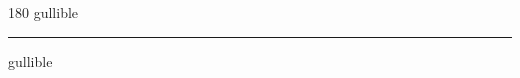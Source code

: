 
\begin{frame}
\begin{center}
\begin{turn}{180}
{\fontsize{2.5cm}{1em}\selectfont gullible}
\end{turn}
\vspace{1em}\par  
\hrule
\vspace{1em}\par  
{\fontsize{2.5cm}{1em}\selectfont gullible}
\end{center}
\end{frame}
